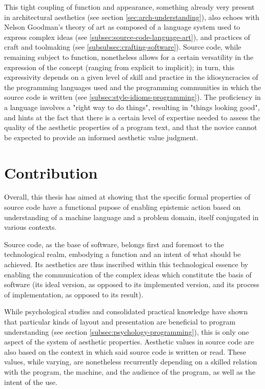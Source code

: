 This tight coupling of function and appearance, something already very present in architectural aesthetics (see section \autoref{sec:arch-understanding}), also echoes with Nelson Goodman's theory of art as composed of a language system used to express complex ideas (see \autoref{subsec:source-code-language-art}), and practices of craft and toolmaking (see \autoref{subsubsec:crafting-software}). Source code, while remaining subject to function, nonetheless allows for a certain versatility in the expression of the concept (ranging from explicit to implicit); in turn, this expressivity depends on a given level of skill and practice in the idiosyncracies of the programming languages used and the programming communities in which the source code is written (see \autoref{subsec:style-idioms-programming}). The proficiency in a language involves a "right way to do things", resulting in "things looking good", and hints at the fact that there is a certain level of expertise needed to assess the quality of the aesthetic properties of a program text, and that the novice cannot be expected to provide an informed aesthetic value judgment.

\section{Contribution}
\label{sec:conclusion-contribution}

Overall, this thesis has aimed at showing that the specific formal properties of source code have a functional pupose of enabling epistemic action based on understanding of a machine language and a problem domain, itself conjugated in various contexts.

Source code, as the base of software, belongs first and foremost to the technological realm, embodying a function and an intent of what should be achieved. Its aesthetics are thus inscribed within this technological essence by enabling the communication of the complex ideas which constitute the basis of software (its ideal version, as opposed to its implemented version, and its process of implementation, as opposed to its result).

While psychological studies and consolidated practical knowledge have shown that particular kinds of layout and presentation are beneficial to program understanding (see section \autoref{subsec:psychology-programming}), this is only one aspect of the system of aesthetic properties. Aesthetic values in source code are also based on the context in which said source code is written or read. These values, while varying, are nonetheless recurrently depending on a skilled relation with the program, the machine, and the audience of the program, as well as the intent of the use.

